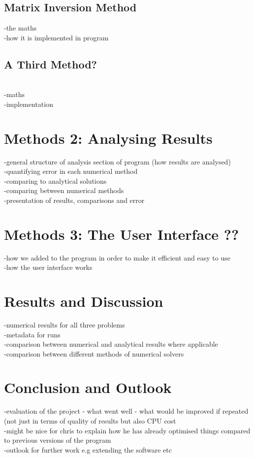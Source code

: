 \documentclass{article}
\begin{document}
\subsection{Matrix Inversion Method}
-the maths \\
-how it is implemented in program \\

\subsection{A Third Method?} \\
-maths \\
-implementation \\



\section{Methods 2: Analysing Results}
-general structure of analysis section of program (how results are analysed) \\
-quantifying error in each numerical method \\
-comparing to analytical solutions \\
-comparing between numerical methods \\
-presentation of  results, comparisons and error \\

\section{Methods 3: The User Interface ??}
-how we added to the program in order to make it efficient and easy to use \\
-how the user interface works \\


\section{Results and Discussion}
-numerical results for all three problems\\
-metadata for runs \\
-comparison between numerical and analytical results where applicable\\
-comparison between different methods of numerical solvers\\

\section{Conclusion and Outlook}
-evaluation of the project - what went well - what would be improved if repeated (not just in terms of quality of results but also CPU cost\\
-might be nice for chris to explain how he has already optimised things compared to previous versions of the program \\
-outlook for further work e.g extending the software etc \\
\end{document}

